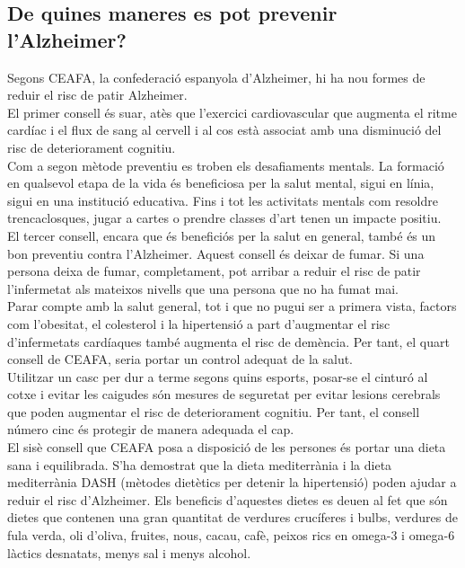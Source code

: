 \documentclass[a4paper,12pt]{article}
\begin{document}
\subsection*{De quines maneres es pot prevenir l'Alzheimer?}
Segons CEAFA, la confederació espanyola d'Alzheimer, hi ha nou formes de reduir el risc de patir Alzheimer.\\
El primer consell és suar, atès que l'exercici cardiovascular que augmenta el ritme cardíac i el flux de sang al cervell i al cos està associat amb una disminució del risc de deteriorament cognitiu.\\
Com a segon mètode preventiu es troben els desafiaments mentals. La formació en qualsevol etapa de la vida és beneficiosa per la salut mental, sigui en línia, sigui en una institució educativa. Fins i tot les activitats mentals com resoldre trencaclosques, jugar a cartes o prendre classes d'art tenen un impacte positiu.\\
El tercer consell, encara que és beneficiós per la salut en general, també és un bon preventiu contra l'Alzheimer. Aquest consell és deixar de fumar. Si una persona deixa de fumar, completament, pot arribar a reduir el risc de patir l'infermetat als mateixos nivells que una persona que no ha fumat mai.\\
Parar compte amb la salut general, tot i que no pugui ser a primera vista, factors com l'obesitat, el colesterol i la hipertensió a part d'augmentar el risc d'infermetats cardíaques també augmenta el risc de demència. Per tant, el quart consell de CEAFA, seria portar un control adequat de la salut.\\
Utilitzar un casc per dur a terme segons quins esports, posar-se el cinturó al cotxe i evitar les caigudes són mesures de seguretat per evitar lesions cerebrals que poden augmentar el risc de deteriorament cognitiu. Per tant, el consell número cinc és protegir de manera adequada el cap.\\
El sisè consell que CEAFA posa a disposició de les persones és portar una dieta sana i equilibrada. S'ha demostrat que la dieta mediterrània i la dieta mediterrània DASH (mètodes dietètics per detenir la hipertensió) poden ajudar a reduir el risc d'Alzheimer. Els beneficis d'aquestes dietes es deuen al fet que són dietes que contenen una gran quantitat de verdures crucíferes i bulbs, verdures de fula verda, oli d'oliva, fruites, nous, cacau, cafè, peixos rics en omega-3 i omega-6 làctics desnatats, menys sal i menys alcohol.\\
\end{document}

